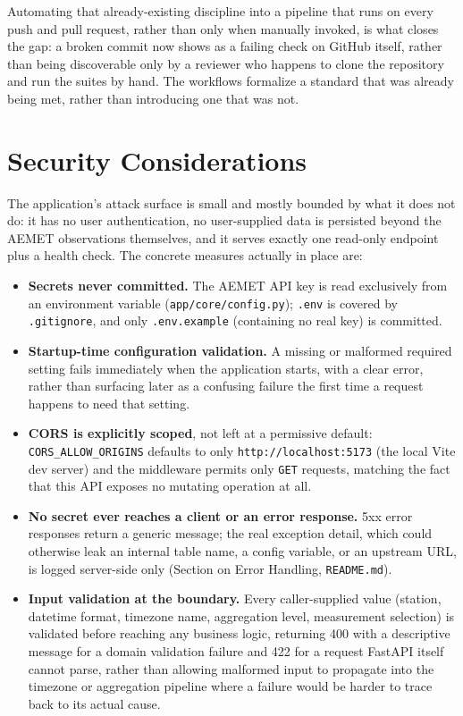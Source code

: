 \documentclass[11pt,a4paper]{article}
\begin{document}
Automating that already-existing discipline into a pipeline that runs on
every push and pull request, rather than only when manually invoked, is
what closes the gap: a broken commit now shows as a failing check on
GitHub itself, rather than being discoverable only by a reviewer who
happens to clone the repository and run the suites by hand. The workflows
formalize a standard that was already being met, rather than introducing
one that was not.

\section{Security Considerations}
\label{sec:security}

The application's attack surface is small and mostly bounded by what it
does not do: it has no user authentication, no user-supplied data is
persisted beyond the AEMET observations themselves, and it serves exactly
one read-only endpoint plus a health check. The concrete measures actually
in place are:

\begin{itemize}[nosep]
    \item \textbf{Secrets never committed.} The AEMET API key is read
    exclusively from an environment variable
    (\texttt{app/core/config.py}); \texttt{.env} is covered by
    \texttt{.gitignore}, and only \texttt{.env.example} (containing no
    real key) is committed.
    \item \textbf{Startup-time configuration validation.} A missing or
    malformed required setting fails immediately when the application
    starts, with a clear error, rather than surfacing later as a confusing
    failure the first time a request happens to need that setting.
    \item \textbf{CORS is explicitly scoped}, not left at a permissive
    default: \texttt{CORS\_ALLOW\_ORIGINS} defaults to only
    \texttt{http://localhost:5173} (the local Vite dev server) and the
    middleware permits only \texttt{GET} requests, matching the fact that
    this API exposes no mutating operation at all.
    \item \textbf{No secret ever reaches a client or an error response.}
    5xx error responses return a generic message; the real exception
    detail, which could otherwise leak an internal table name, a config
    variable, or an upstream URL, is logged server-side only
    (Section on Error Handling, \texttt{README.md}).
    \item \textbf{Input validation at the boundary.} Every caller-supplied
    value (station, datetime format, timezone name, aggregation level,
    measurement selection) is validated before reaching any business
    logic, returning 400 with a descriptive message for a domain
    validation failure and 422 for a request FastAPI itself cannot parse,
    rather than allowing malformed input to propagate into the timezone or
    aggregation pipeline where a failure would be harder to trace back to
    its actual cause.
\end{itemize}
\end{document}
